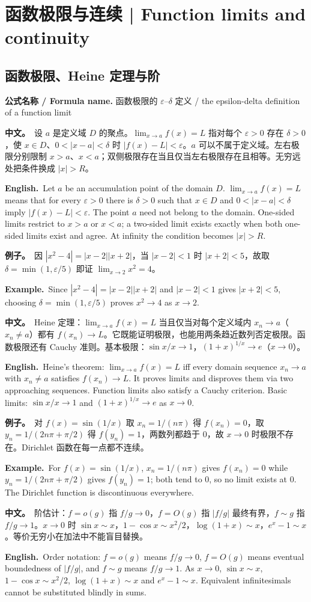 \documentclass[UTF8,11pt,a4paper]{ctexart}
\newcommand{\BOTH}[2]{\par\noindent\textbf{中文。}\ #1\par\noindent\textbf{English.}\ #2\par}
\newcommand{\EX}[2]{\par\noindent\textbf{例子。}\ #1\par\noindent\textbf{Example.}\ #2\par}
\newcommand{\FORMULA}[2]{\par\noindent\textbf{公式名称 / Formula name.} #1 / #2\par}
\begin{document}
\section{函数极限与连续 | Function limits and continuity}
\subsection{函数极限、Heine 定理与阶}
\FORMULA{函数极限的 $\varepsilon$--$\delta$ 定义}{the epsilon-delta definition of a function limit}
\BOTH{设 $a$ 是定义域 $D$ 的聚点。$\lim_{x\to a}f(x)=L$ 指对每个 $\varepsilon>0$ 存在 $\delta>0$，使 $x\in D$、$0<|x-a|<\delta$ 时 $|f(x)-L|<\varepsilon$。$a$ 可以不属于定义域。左右极限分别限制 $x>a$、$x<a$；双侧极限存在当且仅当左右极限存在且相等。无穷远处把条件换成 $|x|>R$。}{Let $a$ be an accumulation point of the domain $D$. $\lim_{x\to a}f(x)=L$ means that for every $\varepsilon>0$ there is $\delta>0$ such that $x\in D$ and $0<|x-a|<\delta$ imply $|f(x)-L|<\varepsilon$. The point $a$ need not belong to the domain. One-sided limits restrict to $x>a$ or $x<a$; a two-sided limit exists exactly when both one-sided limits exist and agree. At infinity the condition becomes $|x|>R$.}
\EX{因 $|x^2-4|=|x-2||x+2|$，当 $|x-2|<1$ 时 $|x+2|<5$，故取 $\delta=\min(1,\varepsilon/5)$ 即证 $\lim_{x\to2}x^2=4$。}{Since $|x^2-4|=|x-2||x+2|$ and $|x-2|<1$ gives $|x+2|<5$, choosing $\delta=\min(1,\varepsilon/5)$ proves $x^2\to4$ as $x\to2$.}
\BOTH{Heine 定理：$\lim_{x\to a}f(x)=L$ 当且仅当对每个定义域内 $x_n\to a$（$x_n\ne a$）都有 $f(x_n)\to L$。它既能证明极限，也能用两条趋近数列否定极限。函数极限还有 Cauchy 准则。基本极限：$\sin x/x\to1$，$(1+x)^{1/x}\to e$（$x\to0$）。}{Heine's theorem: $\lim_{x\to a}f(x)=L$ iff every domain sequence $x_n\to a$ with $x_n\ne a$ satisfies $f(x_n)\to L$. It proves limits and disproves them via two approaching sequences. Function limits also satisfy a Cauchy criterion. Basic limits: $\sin x/x\to1$ and $(1+x)^{1/x}\to e$ as $x\to0$.}
\EX{对 $f(x)=\sin(1/x)$ 取 $x_n=1/(n\pi)$ 得 $f(x_n)=0$，取 $y_n=1/(2n\pi+\pi/2)$ 得 $f(y_n)=1$，两数列都趋于 $0$，故 $x\to0$ 时极限不存在。Dirichlet 函数在每一点都不连续。}{For $f(x)=\sin(1/x)$, $x_n=1/(n\pi)$ gives $f(x_n)=0$ while $y_n=1/(2n\pi+\pi/2)$ gives $f(y_n)=1$; both tend to $0$, so no limit exists at $0$. The Dirichlet function is discontinuous everywhere.}
\BOTH{阶估计：$f=o(g)$ 指 $f/g\to0$，$f=O(g)$ 指 $|f/g|$ 最终有界，$f\sim g$ 指 $f/g\to1$。$x\to0$ 时 $\sin x\sim x$，$1-\cos x\sim x^2/2$，$\log(1+x)\sim x$，$e^x-1\sim x$。等价无穷小在加法中不能盲目替换。}{Order notation: $f=o(g)$ means $f/g\to0$, $f=O(g)$ means eventual boundedness of $|f/g|$, and $f\sim g$ means $f/g\to1$. As $x\to0$, $\sin x\sim x$, $1-\cos x\sim x^2/2$, $\log(1+x)\sim x$ and $e^x-1\sim x$. Equivalent infinitesimals cannot be substituted blindly in sums.}
\end{document}
